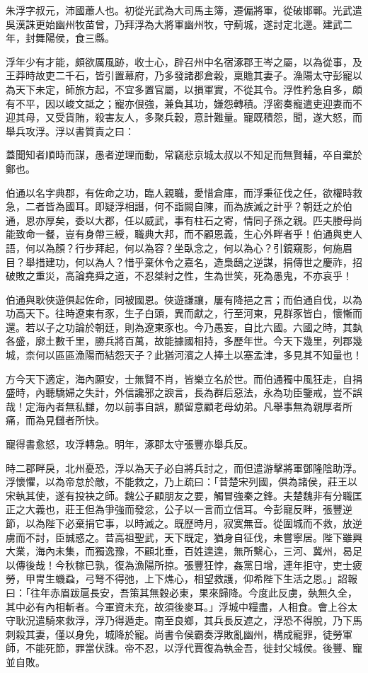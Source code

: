 
\begin{pinyinscope}
朱浮字叔元，沛國蕭人也。初從光武為大司馬主簿，遷偏將軍，從破邯鄲。光武遣吳漢誅更始幽州牧苗曾，乃拜浮為大將軍幽州牧，守薊城，遂討定北邊。建武二年，封舞陽侯，食三縣。

浮年少有才能，頗欲厲風跡，收士心，辟召州中名宿涿郡王岑之屬，以為從事，及王莽時故吏二千石，皆引置幕府，乃多發諸郡倉穀，稟贍其妻子。漁陽太守彭寵以為天下未定，師旅方起，不宜多置官屬，以損軍實，不從其令。浮性矜急自多，頗有不平，因以峻文詆之；寵亦佷強，兼負其功，嫌怨轉積。浮密奏寵遣吏迎妻而不迎其母，又受貨賄，殺害友人，多聚兵穀，意計難量。寵既積怨，聞，遂大怒，而舉兵攻浮。浮以書質責之曰：

蓋聞知者順時而謀，愚者逆理而動，常竊悲京城太叔以不知足而無賢輔，卒自棄於鄭也。

伯通以名字典郡，有佐命之功，臨人親職，愛惜倉庫，而浮秉征伐之任，欲權時救急，二者皆為國耳。即疑浮相譖，何不詣闕自陳，而為族滅之計乎？朝廷之於伯通，恩亦厚矣，委以大郡，任以威武，事有柱石之寄，情同子孫之親。匹夫媵母尚能致命一餐，豈有身帶三綬，職典大邦，而不顧恩義，生心外畔者乎！伯通與吏人語，何以為顏？行步拜起，何以為容？坐臥念之，何以為心？引鏡窺影，何施眉目？舉措建功，何以為人？惜乎棄休令之嘉名，造梟鴟之逆謀，捐傳世之慶祚，招破敗之重災，高論堯舜之道，不忍桀紂之性，生為世笑，死為愚鬼，不亦哀乎！

伯通與耿俠遊俱起佐命，同被國恩。俠遊謙讓，屢有降挹之言；而伯通自伐，以為功高天下。往時遼東有豕，生子白頭，異而獻之，行至河東，見群豕皆白，懷慚而還。若以子之功論於朝廷，則為遼東豕也。今乃愚妄，自比六國。六國之時，其埶各盛，廓土數千里，勝兵將百萬，故能據國相持，多歷年世。今天下幾里，列郡幾城，柰何以區區漁陽而結怨天子？此猶河濱之人捧土以塞孟津，多見其不知量也！

方今天下適定，海內願安，士無賢不肖，皆樂立名於世。而伯通獨中風狂走，自捐盛時，內聽驕婦之失計，外信讒邪之諛言，長為群后惡法，永為功臣鑒戒，豈不誤哉！定海內者無私讎，勿以前事自誤，願留意顧老母幼弟。凡舉事無為親厚者所痛，而為見讎者所快。

寵得書愈怒，攻浮轉急。明年，涿郡太守張豐亦舉兵反。

時二郡畔戾，北州憂恐，浮以為天子必自將兵討之，而但遣游擊將軍鄧隆陰助浮。浮懷懼，以為帝怠於敵，不能救之，乃上疏曰：「昔楚宋列國，俱為諸侯，莊王以宋執其使，遂有投袂之師。魏公子顧朋友之要，觸冒強秦之鋒。夫楚魏非有分職匡正之大義也，莊王但為爭強而發忿，公子以一言而立信耳。今彭寵反畔，張豐逆節，以為陛下必棄捐它事，以時滅之。既歷時月，寂寞無音。從圍城而不救，放逆虜而不討，臣誠惑之。昔高祖聖武，天下既定，猶身自征伐，未嘗寧居。陛下雖興大業，海內未集，而獨逸豫，不顧北垂，百姓遑遑，無所繫心，三河、冀州，曷足以傳後哉！今秋稼已孰，復為漁陽所掠。張豐狂悖，姦黨日增，連年拒守，吏士疲勞，甲冑生蟣蝨，弓弩不得弛，上下燋心，相望救護，仰希陛下生活之恩。」詔報曰：「往年赤眉跋扈長安，吾策其無穀必東，果來歸降。今度此反虜，埶無久全，其中必有內相斬者。今軍資未充，故須後麥耳。」浮城中糧盡，人相食。會上谷太守耿況遣騎來救浮，浮乃得遁走。南至良鄉，其兵長反遮之，浮恐不得脫，乃下馬刺殺其妻，僅以身免，城降於寵。尚書令侯霸奏浮敗亂幽州，構成寵罪，徒勞軍師，不能死節，罪當伏誅。帝不忍，以浮代賈復為執金吾，徙封父城侯。後豐、寵並自敗。


\end{pinyinscope}
